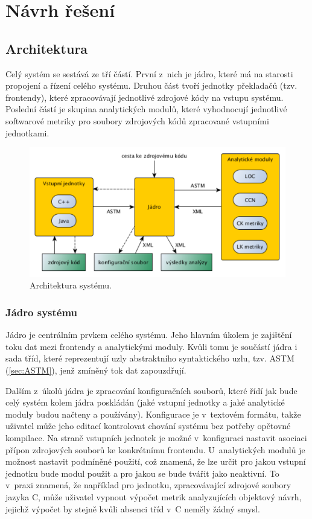 \documentclass[11pt,twoside,a4paper]{book}
\begin{document}
\chapter{Návrh řešení}
\label{sec:Navrh}

\section{Architektura}
\label{sec:Architektura}
Celý systém se sestává ze tří částí. První z~nich je jádro, které má na starosti propojení a řízení celého systému.
Druhou část tvoří jednotky překladačů (tzv. frontendy), které zpracovávají jednotlivé zdrojové kódy na vstupu systému.
Poslední částí je skupina analytických modulů, které vyhodnocují jednotlivé softwarové metriky pro soubory zdrojových kódů
zpracované vstupními jednotkami.

\begin{figure}[H]
\begin{center}
\includegraphics[width=13cm]{figures/architecture.pdf}
\caption{Architektura systému.}
\label{fig:architecture}
\end{center}
\end{figure}

\subsection{Jádro systému}
Jádro je centrálním prvkem celého systému. Jeho hlavním úkolem je zajištění toku dat mezi frontendy a analytickými moduly.
Kvůli tomu je součástí jádra i sada tříd, které reprezentují uzly abstraktního syntaktického uzlu, tzv. ASTM (\ref{sec:ASTM}),
jenž zmíněný tok dat zapouzdřují.

Dalším z~úkolů jádra je zpracování konfiguračních souborů, které řídí jak bude celý systém
kolem jádra poskládán (jaké vstupní jednotky a jaké analytické moduly budou načteny a používány). Konfigurace je v~textovém
formátu, takže uživatel může jeho editací \mbox{kontrolovat} chování systému bez potřeby opětovné kompilace.
Na straně vstupních jednotek je možné v~konfiguraci nastavit asociaci přípon zdrojových souborů ke konkrétnímu frontendu.
U~analytických modulů je možnost nastavit podmíněné použití, což znamená, že lze určit pro jakou
vstupní jednotku bude modul použit a pro jakou se bude tvářit jako neaktivní. To v~praxi znamená, že například pro
jednotku, zpracovávající zdrojové soubory jazyka C, může uživatel vypnout výpočet metrik analyzujících objektový návrh,
jejichž výpočet by stejně kvůli absenci tříd v~C neměly žádný smysl.
\end{document}
